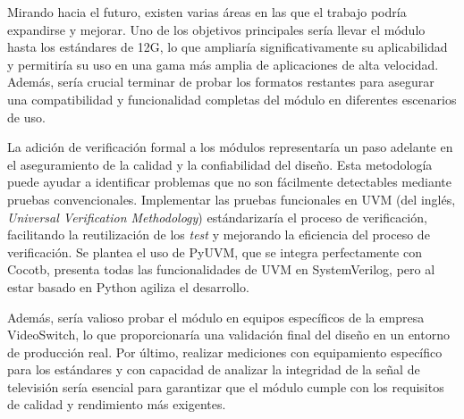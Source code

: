 Mirando hacia el futuro, existen varias áreas en las que el trabajo podría
expandirse y mejorar. Uno de los objetivos principales sería llevar el módulo
hasta los estándares de 12G, lo que ampliaría significativamente su aplicabilidad
y permitiría su uso en una gama más amplia de aplicaciones de alta velocidad.
Además, sería crucial terminar de probar los formatos restantes para asegurar
una compatibilidad y funcionalidad completas del módulo en diferentes escenarios
de uso.

La adición de verificación formal a los módulos representaría un paso adelante
en el aseguramiento de la calidad y la confiabilidad del diseño. Esta
metodología puede ayudar a identificar problemas que no son fácilmente
detectables mediante pruebas convencionales. Implementar las pruebas funcionales
en UVM (del inglés, \textit{Universal Verification Methodology}) estándarizaría el
proceso de verificación, facilitando la reutilización de los \textit{test} y
mejorando la eficiencia del proceso de verificación. Se plantea el uso de PyUVM,
que se integra perfectamente con Cocotb, presenta todas las funcionalidades de
UVM en SystemVerilog, pero al estar basado en Python agiliza el desarrollo.

Además, sería valioso probar el módulo en equipos específicos de la empresa
VideoSwitch, lo que proporcionaría una validación final del diseño en un entorno
de producción real. Por último, realizar mediciones con equipamiento específico
para los estándares y con capacidad de analizar la integridad de la señal de
televisión sería esencial para garantizar que el módulo cumple con los requisitos
de calidad y rendimiento más exigentes.
